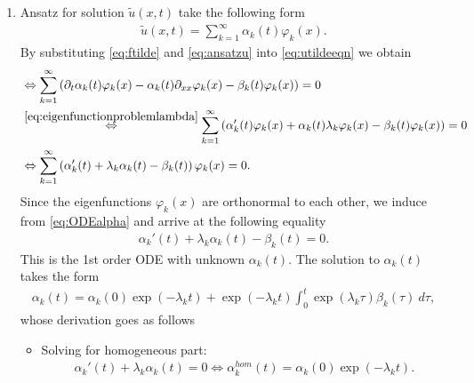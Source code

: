 \documentclass[12pt]{article}
\begin{document}
\begin{enumerate}
	\item Ansatz for solution $\tilde{u}(x,t)$ take the following form
	      \begin{align}
		      \label{eq:ansatzu}
		      \tilde{u}(x,t) = \sum_{k=1}^\infty \alpha_k(t) \varphi_k(x).
	      \end{align}
	      By substituting \eqref{eq:ftilde} and \eqref{eq:ansatzu} into \eqref{eq:utildeeqn} we obtain 
	      \begin{align}
		      \label{eq:ODEalpha}
		       & \Leftrightarrow 
		      \sum_{k=1}^\infty 
		      \left(
		      \partial_t \alpha_{k}(t) \varphi_k(x)
		      - \alpha_k(t) \partial_{xx} \varphi_k(x)
		      - \beta_k(t) \varphi_k(x)
		      \right)
		      = 0             \notag                                               \\
		       & \stackrel{\eqref{eq:eigenfunctionproblemlambda}}{\Leftrightarrow}
		      \sum_{k=1}^\infty 
		      \left( 
		      \alpha_{k}'(t) \varphi_k(x)
		      + \alpha_k(t) \lambda_k \varphi_k(x)
		      - \beta_k(t) \varphi_k(x)
		      \right)              
		      = 0             \notag                                               \\
		       & \Leftrightarrow 
		      \sum_{k=1}^\infty 
		      \left( \alpha_{k}'(t)  + \lambda_k\alpha_k(t) - \beta_k(t) \right) \varphi_k(x)
		      = 0.
	      \end{align}
	      Since the eigenfunctions $\varphi_{k}(x)$ are orthonormal to each other, 
	      we induce from \eqref{eq:ODEalpha} and arrive at the following equality 
	      \begin{align}
		      \label{eq:ODEalphafinal}
		      \boxed{
			      \alpha_{k}'(t) + \lambda_k \alpha_k(t) - \beta_k(t) = 0.
		      }
	      \end{align}
	      This is the 1st order ODE with unknown $\alpha_{k}(t)$. 
	      The solution to $\alpha_k(t)$ takes the form
	      \begin{align*}
		      \alpha_k(t)
		      = \alpha_k(0) \exp(-\lambda_k t)
		      + \exp(-\lambda_k t) \int_0^t \exp(\lambda_k \tau) \beta_k(\tau) \ d\tau,
	      \end{align*}
	      whose derivation goes as follows
	      \begin{itemize}
		      \item Solving for homogeneous part:
		            \begin{align}
			            \alpha_{k}'(t) + \lambda_k \alpha_k(t) = 0 
			            \Leftrightarrow
			            \alpha^{hom}_{k}(t) = \alpha_{k}(0)\exp(-\lambda_k t).

\end{align}
\end{itemize}
\end{enumerate}
\end{document}
